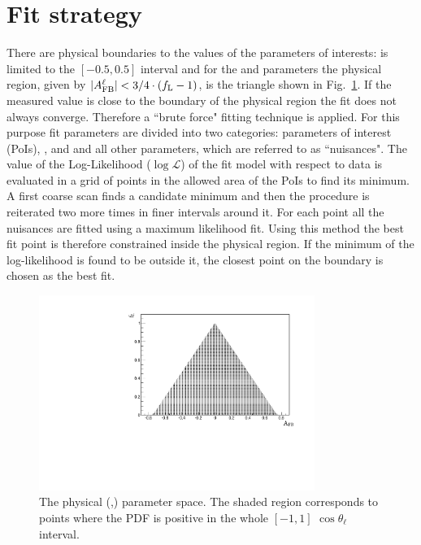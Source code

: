 \section{Fit strategy}

There are physical boundaries to the values of the parameters of interests:
\afbh is limited to the $[-0.5,0.5]$ interval and for the \fl and 
\afbl parameters the physical region, given by $| A_{\rm FB}^\ell | < 3/4 \cdot (f_{\rm L}-1)$,
is the triangle shown in Fig.~\ref{fig:pdfscan}.
If the measured value is close to the boundary of the physical region the fit does not always converge. 
Therefore a ``brute force" fitting technique is applied. For this purpose fit parameters are
divided into two categories: parameters of interest (PoIs), \afbl,
\afbh and \fl and all other parameters, which are referred to as ``nuisances".
The value of the Log-Likelihood ($\log\mathcal{L}$) of the fit model with respect to data 
is evaluated in a grid of points in the allowed area of the PoIs to find its minimum.
A first coarse scan finds a candidate minimum and then the procedure is reiterated two
more times in finer intervals around it. For each point all the nuisances are fitted
using a maximum likelihood fit. Using this method the best fit point is therefore constrained inside
the physical region. If the minimum of the log-likelihood is found to be outside it, the closest point on
the boundary is chosen as the best fit. %

\begin{figure}[h!]
\centering
\includegraphics[width=0.8\textwidth]{Lmumu/figs/scan.pdf}
\caption{The physical (\afbl,\fl) parameter space. The shaded region corresponds 
to points where the PDF is positive in the whole $[-1,1]$ $\cos\theta_\ell$ interval. }
\label{fig:pdfscan}
\end{figure}


